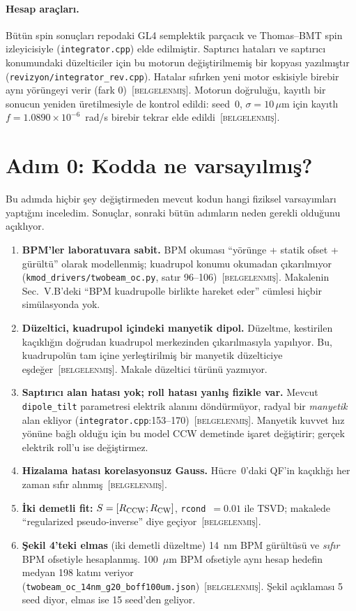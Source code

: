 \documentclass[11pt,a4paper]{article}
\newcommand{\kod}[1]{{\XeTeXinterchartokenstate=0\texttt{#1}}}
\newcommand{\BEL}{\textsc{[belgelenmiş]}}
\begin{document}
\paragraph{Hesap araçları.} Bütün spin sonuçları repodaki GL4 semplektik parçacık ve Thomas--BMT spin
izleyicisiyle (\kod{integrator.cpp}) elde edilmiştir. Saptırıcı hataları ve saptırıcı konumundaki
düzelticiler için bu motorun değiştirilmemiş bir kopyası yazılmıştır (\kod{revizyon/integrator\_rev.cpp}).
Hatalar sıfırken yeni motor eskisiyle birebir aynı yörüngeyi verir (fark 0)~\BEL. Motorun doğruluğu,
kayıtlı bir sonucun yeniden üretilmesiyle de kontrol edildi: seed~0, $\sigma=10\,\mu$m için kayıtlı
$f=1.0890\times10^{-6}$~rad/s birebir tekrar elde edildi~\BEL.

\section{Adım 0: Kodda ne varsayılmış?}

Bu adımda hiçbir şey değiştirmeden mevcut kodun hangi fiziksel varsayımları yaptığını inceledim. Sonuçlar,
sonraki bütün adımların neden gerekli olduğunu açıklıyor.

\begin{enumerate}
\item \textbf{BPM'ler laboratuvara sabit.} BPM okuması ``yörünge + statik ofset + gürültü'' olarak
modellenmiş; kuadrupol konumu okumadan çıkarılmıyor (\kod{kmod\_drivers/twobeam\_oc.py}, satır 96--106)~\BEL.
Makalenin Sec.~V.B'deki ``BPM kuadrupolle birlikte hareket eder'' cümlesi hiçbir simülasyonda yok.
\item \textbf{Düzeltici, kuadrupol içindeki manyetik dipol.} Düzeltme, kestirilen kaçıklığın doğrudan
kuadrupol merkezinden çıkarılmasıyla yapılıyor. Bu, kuadrupolün tam içine yerleştirilmiş bir manyetik
düzelticiye eşdeğer~\BEL. Makale düzeltici türünü yazmıyor.
\item \textbf{Saptırıcı alan hatası yok; roll hatası yanlış fizikle var.} Mevcut \kod{dipole\_tilt}
parametresi elektrik alanını döndürmüyor, radyal bir \emph{manyetik} alan ekliyor
(\kod{integrator.cpp}:153--170)~\BEL. Manyetik kuvvet hız yönüne bağlı olduğu için bu model CCW demetinde
işaret değiştirir; gerçek elektrik roll'u ise değiştirmez.
\item \textbf{Hizalama hatası korelasyonsuz Gauss.} Hücre~0'daki QF'in kaçıklığı her zaman sıfır
alınmış~\BEL.
\item \textbf{İki demetli fit:} $S=[R_{\rm CCW};R_{\rm CW}]$, \kod{rcond}~$=0.01$ ile TSVD; makalede
``regularized pseudo-inverse'' diye geçiyor~\BEL.
\item \textbf{Şekil 4'teki elmas} (iki demetli düzeltme) 14~nm BPM gürültüsü ve \emph{sıfır} BPM ofsetiyle
hesaplanmış. 100~$\mu$m BPM ofsetiyle aynı hesap hedefin medyan 198 katını veriyor
(\kod{twobeam\_oc\_14nm\_g20\_boff100um.json})~\BEL. Şekil açıklaması 5 seed diyor, elmas ise 15 seed'den geliyor.
\end{enumerate}
\end{document}
